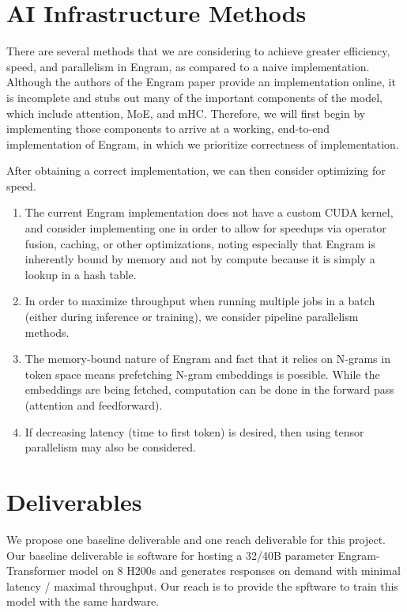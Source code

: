 \documentclass{article}
\begin{document}
\section{AI Infrastructure Methods}
There are several methods that we are considering to achieve greater efficiency, speed, and parallelism in Engram, as compared to a naive implementation. Although the authors of the Engram paper \cite{cheng_conditional_2026} provide an implementation online, it is incomplete and stubs out many of the important components of the model, which include attention, MoE, and mHC. Therefore, we will first begin by implementing those components to arrive at a working, end-to-end implementation of Engram, in which we prioritize correctness of implementation. 
\par After obtaining a correct implementation, we can then consider optimizing for speed. 
\begin{enumerate}
    \item The current Engram implementation does not have a custom CUDA kernel, and consider implementing one in order to allow for speedups via operator fusion, caching, or other optimizations, noting especially that Engram is inherently bound by memory and not by compute because it is simply a lookup in a hash table.
    \item In order to maximize throughput when running multiple jobs in a batch (either during inference or training), we consider pipeline parallelism methods.
    \item The memory-bound nature of Engram and fact that it relies on N-grams in token space means prefetching N-gram embeddings is possible. While the embeddings are being fetched, computation can be done in the forward pass (attention and feedforward).
    \item If decreasing latency (time to first token) is desired, then using tensor parallelism may also be considered.
\end{enumerate}


\section{Deliverables}

We propose one baseline deliverable and one reach deliverable for this project. Our baseline deliverable is software for hosting a 32/40B parameter Engram-Transformer model on 8 H200s and generates responses on demand with minimal latency / maximal throughput. Our reach is to provide the spftware to train this model with the same hardware.
\end{document}
